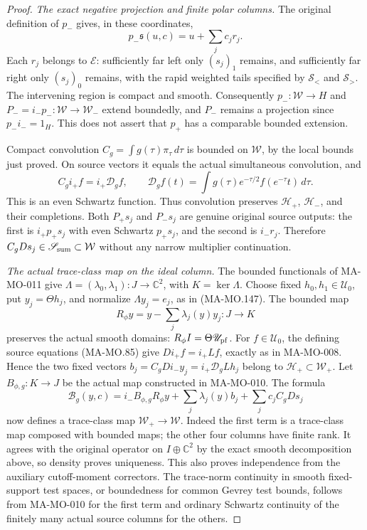 \begin{proof}
\emph{The exact negative projection and finite polar columns.}
The original definition of \(p_-\) gives, in these coordinates,
\[
       p_-\mathfrak s(u,c)=u+\sum_jc_jr_j.
 \tag{MA-MO.262}
\]
Each \(r_j\) belongs to \(\mathcal E\): sufficiently far
left only \((s_j)_1\) remains, and sufficiently far right
only \((s_j)_0\) remains, with the rapid weighted tails
specified by \(\mathcal S_<\) and \(\mathcal S_>\).
The intervening region is compact and smooth. Consequently
\(p_-:\mathcal W\to H\) and
\(P_-=i_-p_-:\mathcal W\to\mathcal W_-\) extend
boundedly, and \(P_-\) remains a projection since
\(p_-i_-=1_H\). This does not assert that \(p_+\) has
a comparable bounded extension.

Compact convolution \(C_g=\int g(\tau)\pi_\tau\,d\tau\)
is bounded on \(\mathcal W\), by the local bounds just
proved. On source vectors it equals the actual simultaneous
convolution, and
\[
 C_gi_+f=i_+\mathcal D_gf,\qquad
 \mathcal D_gf(t)=\int g(\tau)e^{-\tau/2}f(e^{-\tau}t)\,d\tau.
 \tag{MA-MO.263}
\]
This is an even Schwartz function. Thus convolution preserves
\(\mathscr H_+\), \(\mathscr H_-\), and their completions.
Both \(P_+s_j\) and \(P_-s_j\) are genuine original source
outputs: the first is \(i_+p_+s_j\) with even Schwartz
\(p_+s_j\), and the second is \(i_-r_j\).
Therefore \(C_gDs_j\in\mathscr S_{\rm sum}\subset\mathcal W\)
without any narrow multiplier continuation.

\emph{The actual trace-class map on the ideal column.}
The bounded functionals of MA-MO-011 give
\(\Lambda=(\lambda_0,\lambda_1):J\to\mathbb C^2\),
with \(K=\ker\Lambda\). Choose fixed
\(h_0,h_1\in\mathscr U_0\), put \(y_j=\Theta h_j\),
and normalize \(\Lambda y_j=e_j\), as in (MA-MO.147).
The bounded map
\[
          R_\phi y=y-\sum_j\lambda_j(y)y_j:J\to K
 \tag{MA-MO.264}
\]
preserves the actual smooth domains:
\(R_\phi I=\Theta\mathscr U_{\rm pf}\).
For \(f\in\mathscr U_0\), the defining source equations
(MA-MO.85) give \(D i_+f=i_+Lf\), exactly as in
MA-MO-008. Hence the two fixed vectors
\(b_j=C_gD i_-y_j=i_+\mathcal D_gLh_j\) belong to
\(\mathscr H_+\subset\mathcal W_+\).
Let \(B_{\phi,g}:K\to J\) be the actual map constructed
in MA-MO-010. The formula
\[
 \mathcal B_g(y,c)=
   i_-B_{\phi,g}R_\phi y
       +\sum_j\lambda_j(y)b_j
       +\sum_jc_j C_gDs_j
 \tag{MA-MO.265}
\]
now defines a trace-class map \(\mathcal W_+\to\mathcal W\).
Indeed the first term is a trace-class map composed with
bounded maps; the other four columns have finite rank.
It agrees with the original operator on
\(I\oplus\mathbb C^2\) by the exact smooth decomposition
above, so density proves uniqueness. This also proves
independence from the auxiliary cutoff-moment correctors.
The trace-norm continuity in smooth fixed-support test spaces,
or boundedness for common Gevrey test bounds, follows from
MA-MO-010 for the first term and ordinary Schwartz continuity
of the finitely many actual source columns for the others.


\end{proof}
